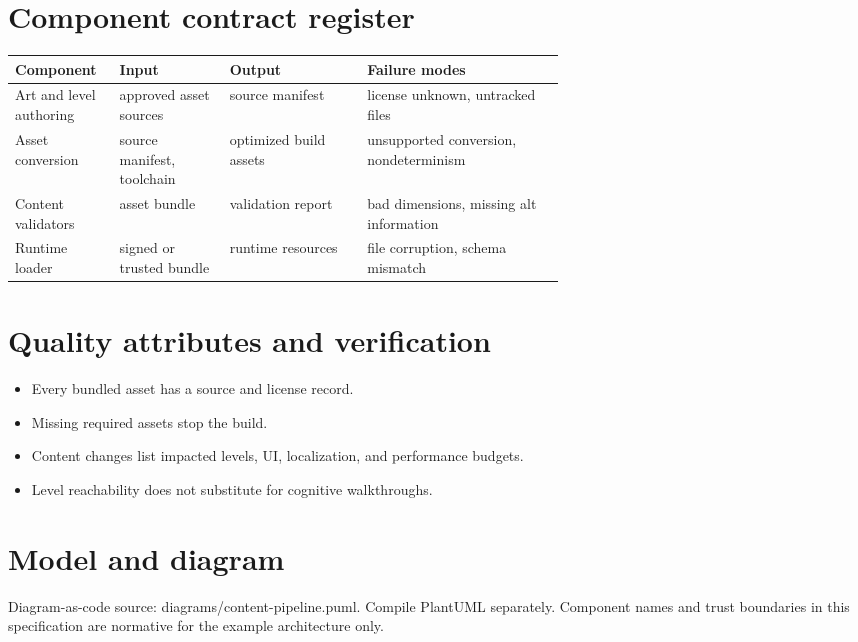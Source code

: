 \documentclass[11pt]{article}
\begin{document}
\section{Component contract register}
\begin{longtable}{@{}>{\raggedright\arraybackslash}p{0.19\linewidth}>{\raggedright\arraybackslash}p{0.20\linewidth}>{\raggedright\arraybackslash}p{0.25\linewidth}>{\raggedright\arraybackslash}p{}@{}}\toprule Component & Input & Output & Failure modes\\\midrule\endhead
Art and level authoring & approved asset sources & source manifest & license unknown, untracked files \\
Asset conversion & source manifest, toolchain & optimized build assets & unsupported conversion, nondeterminism \\
Content validators & asset bundle & validation report & bad dimensions, missing alt information \\
Runtime loader & signed or trusted bundle & runtime resources & file corruption, schema mismatch \\
\bottomrule\end{longtable}

\section{Quality attributes and verification}
\begin{itemize}
\item Every bundled asset has a source and license record.
\item Missing required assets stop the build.
\item Content changes list impacted levels, UI, localization, and performance budgets.
\item Level reachability does not substitute for cognitive walkthroughs.
\end{itemize}

\section{Model and diagram}
Diagram-as-code source: diagrams/content-pipeline.puml. Compile PlantUML separately. Component names and trust boundaries in this specification are normative for the example architecture only.
\end{document}

